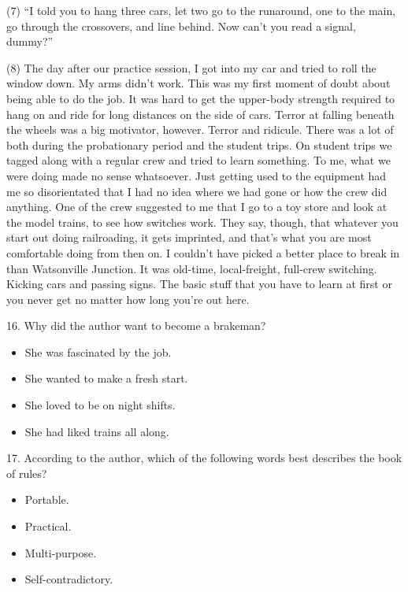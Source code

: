 \documentclass[UTF8,11pt]{ctexart}
\begin{document}
(7) “I told you to hang three cars, let two go to the runaround, one to the main, go through the crossovers, and line behind. Now can’t you read a signal, dummy?”


(8) The day after our practice session, I got into my car and tried to roll the window down. My arms didn’t work. This was my first moment of doubt about being able to do the job. It was hard to get the upper-body strength required to hang on and ride for long distances on the side of cars. Terror at falling beneath the wheels was a big motivator, however. Terror and ridicule. There was a lot of both during the probationary period and the student trips. On student trips we tagged along with a regular crew and tried to learn something. To me, what we were doing made no sense whatsoever. Just getting used to the equipment had me so disorientated that I had no idea where we had gone or how the crew did anything. One of the crew suggested to me that I go to a toy store and look at the model trains, to see how switches work. They say, though, that whatever you start out doing railroading, it gets imprinted, and that’s what you are most comfortable doing from then on. I couldn’t have picked a better place to break in than Watsonville Junction. It was old-time, local-freight, full-crew switching. Kicking cars and passing signs. The basic stuff that you have to learn at first or you never get no matter how long you’re out here.


16. Why did the author want to become a brakeman?


\begin{itemize}[leftmargin=2em,itemsep=.2em,topsep=.4em]\item[A.] She was fascinated by the job.
\item[B.] She wanted to make a fresh start.
\item[C.] She loved to be on night shifts.
\item[D.] She had liked trains all along.
\end{itemize}

17. According to the author, which of the following words best describes the book of rules?


\begin{itemize}[leftmargin=2em,itemsep=.2em,topsep=.4em]\item[A.] Portable.
\item[B.] Practical.
\item[C.] Multi-purpose.
\item[D.] Self-contradictory.
\end{itemize}
\end{document}
